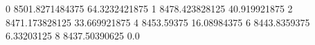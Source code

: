 0 8501.8271484375 64.3232421875
1 8478.423828125 40.919921875
2 8471.173828125 33.669921875
4 8453.59375 16.08984375
6 8443.8359375 6.33203125
8 8437.50390625 0.0
